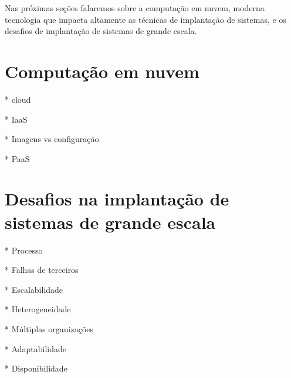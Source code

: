 Nas próximas seções falaremos sobre a computação em nuvem,
moderna tecnologia que impacta altamente as técnicas de implantação de sistemas,
e os desafios de implantação de sistemas de grande escala.

\section{Computação em nuvem}

* cloud 

* IaaS

* Imagens vs configuração

* PaaS


\section{Desafios na implantação de sistemas de grande escala}

* Processo

* Falhas de terceiros

* Escalabilidade

* Heterogeneidade

* Múltiplas organizações

* Adaptabilidade

* Disponibilidade


